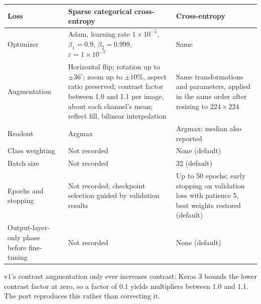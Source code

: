 \documentclass{icsthesis}
\begin{document}
\begin{mainmatter}
\begin{table}[htbp]
\begin{tabular}{p{2.6cm}p{5.6cm}p{5.6cm}}
					Loss & Sparse categorical cross-entropy & Cross-entropy \\ \hline
					Optimizer & Adam, learning rate $1 \times 10^{-5}$, $\beta_1 = 0.9$,
					$\beta_2 = 0.999$, $\varepsilon = 1 \times 10^{-7}$ & Same \\ \hline
					Augmentation & Horizontal flip; rotation up to $\pm 36^{\circ}$; zoom up to
					$\pm 10\%$, aspect ratio preserved; contrast factor between 1.0 and 1.1 per
					image, about each channel's mean; reflect fill, bilinear interpolation &
					Same transformations and parameters, applied in the same order after
					resizing to $224 \times 224$ \\ \hline
					Readout & Argmax & Argmax; median also reported \\ \hline
					Class weighting & Not recorded & None (default) \\ \hline
					Batch size & Not recorded & 32 (default) \\ \hline
					Epochs and stopping & Not recorded; checkpoint selection guided by
					validation results \citep{casasola2026} & Up to 50 epochs; early stopping on
					validation loss with patience 5, best weights restored (default) \\ \hline
					Output-layer-only phase before fine-tuning & Not recorded & None (default)
					\\ \hline\hline
					\end{tabular}
				\vspace{4ex}
				\end{table}

				v1's contrast augmentation only ever increases contrast: Keras 3 bounds
				the lower contrast factor at zero, so a factor of 0.1 yields multipliers
				between 1.0 and 1.1. The port reproduces this rather than correcting it.

	\end{mainmatter}
\end{document}
